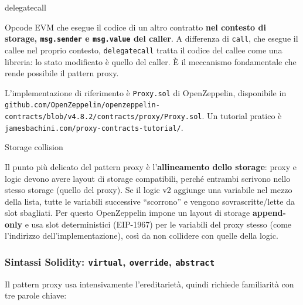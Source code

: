 \documentclass[
  italian,
  openany]{book}
\begin{document}
\begin{calloutdefinition}{delegatecall}

Opcode EVM che esegue il codice di un altro contratto \textbf{nel
contesto di storage, \texttt{msg.sender} e \texttt{msg.value} del
caller}. A differenza di \texttt{call}, che esegue il callee nel proprio
contesto, \texttt{delegatecall} tratta il codice del callee come una
libreria: lo stato modificato è quello del caller. È il meccanismo
fondamentale che rende possibile il pattern proxy.

\end{calloutdefinition}

L'implementazione di riferimento è \texttt{Proxy.sol} di OpenZeppelin,
disponibile in
\texttt{github.com/OpenZeppelin/openzeppelin-contracts/blob/v4.8.2/contracts/proxy/Proxy.sol}.
Un tutorial pratico è
\texttt{jamesbachini.com/proxy-contracts-tutorial/}.

\begin{calloutwarning}{Storage collision}

Il punto più delicato del pattern proxy è l'\textbf{allineamento dello
storage}: proxy e logic devono avere layout di storage compatibili,
perché entrambi scrivono nello stesso storage (quello del proxy). Se il
logic v2 aggiunge una variabile nel mezzo della lista, tutte le
variabili successive ``scorrono'' e vengono sovrascritte/lette da slot
sbagliati. Per questo OpenZeppelin impone un layout di storage
\textbf{append-only} e usa slot deterministici (EIP-1967) per le
variabili del proxy stesso (come l'indirizzo dell'implementazione), così
da non collidere con quelle della logic.

\end{calloutwarning}

\subsubsection{\texorpdfstring{Sintassi Solidity: \texttt{virtual},
\texttt{override},
\texttt{abstract}}{Sintassi Solidity: virtual, override, abstract}}\label{sintassi-solidity-virtual-override-abstract}

Il pattern proxy usa intensivamente l'ereditarietà, quindi richiede
familiarità con tre parole chiave:
\end{document}

